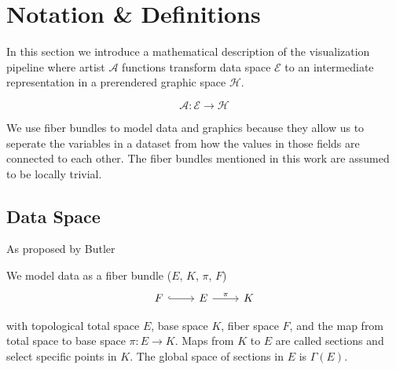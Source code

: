 \documentclass[../main.tex]{subfiles}
\begin{document}
\section{Notation \& Definitions}

 
In this section we introduce a mathematical description of the visualization pipeline where artist $\mathscr{A}$ functions transform data space $\mathscr{E}$ to an intermediate representation in a prerendered graphic space $\mathscr{H}$. 

\begin{equation}
    \label{eq:artist}
    \mathscr{A}: \mathscr{E} \rightarrow \mathscr{H}
\end{equation}

We use fiber bundles\cite{FiberBundle2020, rowlandFiberBundle} to model data and graphics because they allow us to seperate the variables in a dataset from how the values in those fields are connected to each other. The fiber bundles mentioned in this work are assumed to be locally trivial\cite{spanier1989algebraic,LocallyTrivialFibre}. 


\subsection{Data Space}

As proposed by Butler \cite{butlerVectorBundleClassesForm1992,butlerVisualizationModelBased1989}



We model data as a fiber bundle ($E$, $K$, $\pi$, $F$)
\begin{equation}
    \label{eq:fiber_bundle}
    \begin{tikzcd}
        F \arrow[r, hook] & E \arrow[r, "\pi"] & K
    \end{tikzcd}
\end{equation}

with topological total space $E$, base space $K$, fiber space $F$, and the map from total space to base space $\pi: E \rightarrow K$. Maps from $K$ to $E$ are called sections and select specific points in $K$. The global space of sections in $E$ is $\Gamma(E)$.
\end{document}

